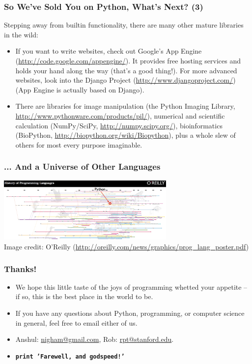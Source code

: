 \documentclass[10pt]{beamer}
\begin{document}
\begin{frame}
  \frametitle{So We've Sold You on Python, What's Next? (3)}
  Stepping away from builtin functionality, there are many other mature libraries in the wild:
  \begin{itemize}
    \item If you want to write websites, check out Google's App Engine (\href{http://code.google.com/appengine/}{http://code.google.com/appengine/}).  It provides free hosting services and holds your hand along the way (that's a good thing!).  For more advanced websites, look into the Django Project (\href{http://www.djangoproject.com/}{http://www.djangoproject.com/}) (App Engine is actually based on Django). 
    \item There are libraries for image manipulation (the Python Imaging Library, \href{http://www.pythonware.com/products/pil}{http://www.pythonware.com/products/pil/}), numerical and scientific calculation (NumPy/SciPy, \href{http://numpy.scipy.org/}{http://numpy.scipy.org/}), bioinformatics (BioPython, \href{http://biopython.org/wiki/Biopython}{http://biopython.org/wiki/Biopython}), plus a whole slew of others for most every purpose imaginable.
  \end{itemize}
\end{frame}

\begin{frame}
  \frametitle{... And a Universe of Other Languages}
  \begin{center}
    \includegraphics[width=330px]{ProgrammingLanguagesPoster-AnnotatedCropped.png} \\
    \tiny 
    Image credit: O'Reilly (\href{http://oreilly.com/news/graphics/prog\_lang\_poster.pdf}{http://oreilly.com/news/graphics/prog\_lang\_poster.pdf})
  \end{center}
\end{frame}

\begin{frame}
  \frametitle{Thanks!}
  \begin{itemize}
    \item We hope this little taste of the joys of programming whetted your appetite -- if so, this is the best place in the world to be.
    \item If you have any questions about Python, programming, or computer science in general, feel free to email either of us.
    \item Anshul: \href{mailto:nigham@gmail.com}{nigham@gmail.com}, Rob: \href{mailto:rpt@stanford.edu}{rpt@stanford.edu}.
    \item \texttt{\textbf{print 'Farewell, and godspeed!'}}
  \end{itemize}
\end{frame}
\end{document}

